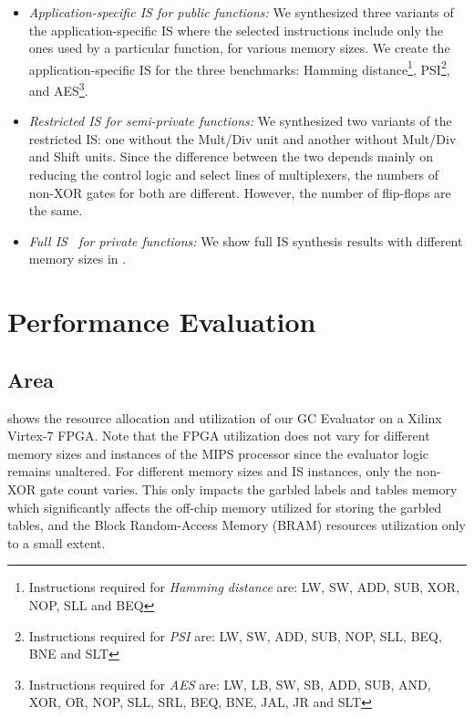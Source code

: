 \begin{itemize}
\item \emph{Application-specific IS for public functions:} We synthesized three variants of the application-specific IS where the selected instructions include only the ones used by a particular function, for various memory sizes. We create the application-specific IS for the three benchmarks: Hamming distance\footnote{\small{Instructions required for \emph{Hamming distance} are:} \tiny{LW, SW, ADD, SUB, XOR, NOP, SLL and BEQ}}, PSI\footnote{\small{Instructions required for \emph{PSI} are:} \tiny{LW, SW, ADD, SUB, NOP, SLL, BEQ, BNE and SLT}}, and AES\footnote{ \small{Instructions required for \emph{AES} are:} \tiny{LW, LB, SW, SB, ADD, SUB, AND, XOR, OR, NOP, SLL, SRL, BEQ, BNE, JAL, JR and SLT}}.
\item \emph{Restricted IS for semi-private functions:} We synthesized two variants of the restricted IS: one without the Mult/Div unit and another without Mult/Div and Shift units. Since the difference between the two depends mainly on reducing the control logic and select lines of multiplexers, the numbers of non-XOR gates for both are different. However, the number of flip-flops are the same.
\item \emph{Full IS~\cite{songhori2015tinygarble} for private functions:} We show full IS synthesis results with different memory sizes in .
\end{itemize}

\section{Performance Evaluation}
\subsection{Area}  shows the resource allocation and utilization of our GC Evaluator on a Xilinx Virtex-7 FPGA. Note that the FPGA utilization does not vary for different memory sizes and instances of the MIPS processor since the evaluator logic remains unaltered. For different memory sizes and IS instances, only the non-XOR gate count varies. This only impacts the garbled labels and tables memory which significantly affects the off-chip memory utilized for storing the garbled tables, and the Block Random-Access Memory (BRAM) resources utilization only to a small extent.

